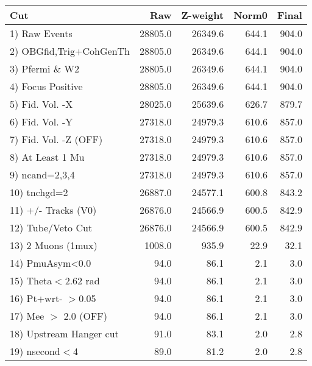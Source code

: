  \begin{table}[h!]\centering
 \begin{tabular}{||l||r|r|r|r||}
 \hline
 \hline
 Cut & Raw & Z-weight & Norm0 & Final \\
 \hline
  1) Raw Events           &     28805.0 &     26349.6 &       644.1 &       904.0 \\
  2) OBGfid,Trig+CohGenTh &     28805.0 &     26349.6 &       644.1 &       904.0 \\
  3) Pfermi \& W2         &     28805.0 &     26349.6 &       644.1 &       904.0 \\
  4) Focus Positive       &     28805.0 &     26349.6 &       644.1 &       904.0 \\
  5) Fid. Vol. -X         &     28025.0 &     25639.6 &       626.7 &       879.7 \\
  6) Fid. Vol. -Y         &     27318.0 &     24979.3 &       610.6 &       857.0 \\
  7) Fid. Vol. -Z (OFF)   &     27318.0 &     24979.3 &       610.6 &       857.0 \\
  8) At Least 1 Mu        &     27318.0 &     24979.3 &       610.6 &       857.0 \\
  9) ncand=2,3,4          &     27318.0 &     24979.3 &       610.6 &       857.0 \\
 10) tnchgd=2             &     26887.0 &     24577.1 &       600.8 &       843.2 \\
 11) +/- Tracks (V0)      &     26876.0 &     24566.9 &       600.5 &       842.9 \\
 12) Tube/Veto Cut        &     26876.0 &     24566.9 &       600.5 &       842.9 \\
 13) 2 Muons (1mux)       &      1008.0 &       935.9 &        22.9 &        32.1 \\
 14) PmuAsym<0.0          &        94.0 &        86.1 &         2.1 &         3.0 \\
 15) Theta$<$2.62 rad     &        94.0 &        86.1 &         2.1 &         3.0 \\
 16) Pt+wrt- $>$0.05      &        94.0 &        86.1 &         2.1 &         3.0 \\
 17) Mee $>$ 2.0  (OFF)   &        94.0 &        86.1 &         2.1 &         3.0 \\
 18) Upstream Hanger cut  &        91.0 &        83.1 &         2.0 &         2.8 \\
 19) nsecond$<$4          &        89.0 &        81.2 &         2.0 &         2.8 \\

\end{tabular}
\end{table}

